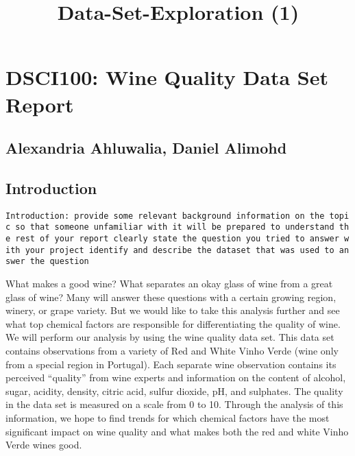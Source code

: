 \documentclass[11pt]{article}
\title{Data-Set-Exploration (1)}
\begin{document}
    
    
    \maketitle
    
    

    
    \hypertarget{dsci100-wine-quality-data-set-report}{%
\section{DSCI100: Wine Quality Data Set
Report}\label{dsci100-wine-quality-data-set-report}}

    \hypertarget{alexandria-ahluwalia-daniel-alimohd}{%
\subsection{Alexandria Ahluwalia, Daniel
Alimohd}\label{alexandria-ahluwalia-daniel-alimohd}}

    \hypertarget{introduction}{%
\subsection{Introduction}\label{introduction}}

\texttt{Introduction:\ provide\ some\ relevant\ background\ information\ on\ the\ topic\ so\ that\ someone\ unfamiliar\ with\ it\ will\ be\ prepared\ to\ understand\ the\ rest\ of\ your\ report\ clearly\ state\ the\ question\ you\ tried\ to\ answer\ with\ your\ project\ identify\ and\ describe\ the\ dataset\ that\ was\ used\ to\ answer\ the\ question}

What makes a good wine? What separates an okay glass of wine from a
great glass of wine? Many will answer these questions with a certain
growing region, winery, or grape variety. But we would like to take this
analysis further and see what top chemical factors are responsible for
differentiating the quality of wine. We will perform our analysis by
using the wine quality data set. This data set contains observations
from a variety of Red and White Vinho Verde (wine only from a special
region in Portugal). Each separate wine observation contains its
perceived ``quality'' from wine experts and information on the content
of alcohol, sugar, acidity, density, citric acid, sulfur dioxide, pH,
and sulphates. The quality in the data set is measured on a scale from 0
to 10. Through the analysis of this information, we hope to find trends
for which chemical factors have the most significant impact on wine
quality and what makes both the red and white Vinho Verde wines good.
\end{document}
